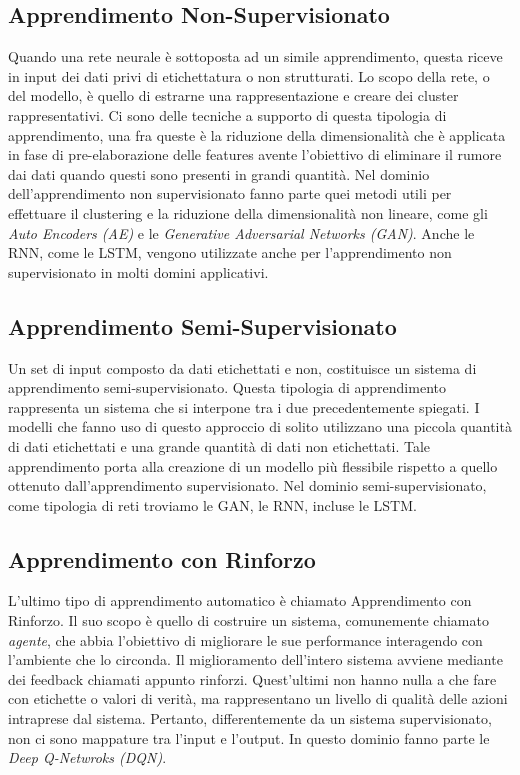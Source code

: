 \subsection{Apprendimento Non-Supervisionato}
Quando una rete neurale è sottoposta ad un simile apprendimento, questa 
riceve in input dei dati privi di etichettatura o non strutturati. Lo scopo 
della rete, o del modello, è quello di estrarne una rappresentazione e creare 
dei cluster rappresentativi. Ci sono delle tecniche a supporto di questa 
tipologia di apprendimento, una fra queste è la riduzione della dimensionalità 
che è applicata in fase di pre-elaborazione delle features avente l'obiettivo di 
eliminare il rumore dai dati quando questi sono presenti in grandi quantità. 
Nel dominio dell'apprendimento non supervisionato fanno parte quei metodi 
utili per effettuare il clustering e la riduzione della dimensionalità non lineare, 
come gli \emph{Auto Encoders (AE)} e le \emph{Generative Adversarial Networks (GAN)}. 
Anche le RNN, come le LSTM, vengono utilizzate anche per l'apprendimento 
non supervisionato in molti domini applicativi.  

\subsection{Apprendimento Semi-Supervisionato}
Un set di input composto da dati etichettati e non, costituisce un sistema di apprendimento 
semi-supervisionato. Questa tipologia di apprendimento rappresenta 
un sistema che si interpone tra i due precedentemente spiegati. I modelli che fanno 
uso di questo approccio di solito utilizzano una piccola quantità di dati etichettati 
e una grande quantità di dati non etichettati. Tale apprendimento porta alla 
creazione di un modello più flessibile rispetto a quello ottenuto dall'apprendimento 
supervisionato. Nel dominio semi-supervisionato, come tipologia di reti troviamo le GAN, le RNN, incluse le LSTM.

\subsection{Apprendimento con Rinforzo}
L'ultimo tipo di apprendimento automatico è chiamato Apprendimento con 
Rinforzo. Il suo scopo è quello di costruire un sistema, comunemente chiamato 
\emph{agente}, che abbia l'obiettivo di migliorare le sue performance interagendo con 
l'ambiente che lo circonda. Il miglioramento dell'intero sistema avviene mediante 
dei feedback chiamati appunto rinforzi. Quest'ultimi non hanno nulla a che fare 
con etichette o valori di verità, ma rappresentano un livello di qualità delle azioni 
intraprese dal sistema. Pertanto, differentemente da un sistema supervisionato, 
non ci sono mappature tra l'input e l'output. In questo dominio fanno parte le \emph{Deep Q-Netwroks (DQN)}.


